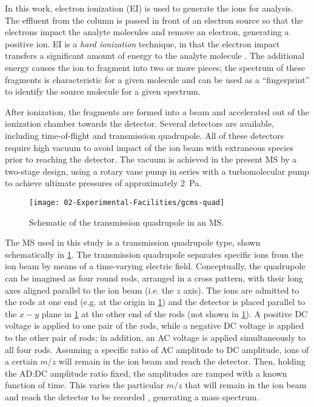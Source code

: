 \documentclass[../main.tex]{subfiles}
\begin{document}
In this work, electron ionization (EI) is used to generate the ions for
analysis. The effluent from the column is passed in front of an electron
source so that the electrons impact the analyte molecules and remove an
electron, generating a positive ion. EI is a \textit{hard ionization}
technique, in that the electron impact transfers a significant amount of energy
to the analyte molecule \cite{Sparkman2011}. The additional energy causes
the ion to fragment into two or more pieces; the spectrum of these fragments
is characteristic for a given molecule and can be used as a ``fingerprint''
to identify the source molecule for a given spectrum.

After ionization, the fragments are formed into a beam and accelerated out of the ionization
chamber towards the detector. Several detectors are available, including
time-of-flight and transmission quadrupole. All of these detectors require
high vacuum to avoid impact of the ion beam with extraneous species
prior to reaching the detector. The vacuum is achieved in the present
MS by a two-stage design, using a rotary vane pump in series with a
turbomolecular pump to achieve ultimate pressures of approximately \SI{2}{\pascal}.

\begin{figure}
\texttt{[image: 02-Experimental-Facilities/gcms-quad]}
\caption{Schematic of the transmission quadrupole in an MS.}
\label{fig:gcms-quad}
\end{figure}

The MS used in this study is a transmission quadrupole type, shown
schematically in \cref{fig:gcms-quad}. The transmission quadrupole separates
specific ions from the ion beam by
means of a time-varying electric field. Conceptually, the quadrupole
can be imagined as four round rods, arranged in a cross pattern, with
their long axes aligned parallel to the ion beam (i.e. the $z$ axis).
The ions are admitted to the rods at one end (e.g. at the origin in
\cref{fig:gcms-quad}) and the detector is placed parallel to the $x-y$ plane
in \cref{fig:gcms-quad} at the other end of the rods (not shown in
\cref{fig:gcms-quad}). A positive DC voltage is applied
to one pair of the rods, while a negative DC voltage is applied to the other
pair of rods; in addition, an AC voltage is applied simultaneously to all four
rods. Assuming a specific ratio of AC amplitude to DC amplitude, ions of a certain
$m/z$ will remain in the ion beam and reach the detector.
Then, holding the AD:DC amplitude ratio fixed, the amplitudes are ramped with a known
function of time. This varies the particular $m/z$ that will remain in the ion beam
and reach the detector to be recorded \cite{Sparkman2011}, generating a mass spectrum.
\end{document}
